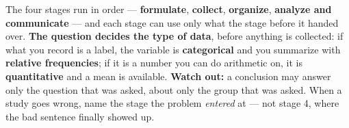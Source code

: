 \documentclass[12pt]{article}
\begin{document}
\vspace{0.14in}

\begin{remindbox}
\small
The four stages run in order --- \textbf{formulate}, \textbf{collect}, \textbf{organize},
\textbf{analyze and communicate} --- and each stage can use only what the stage before it
handed over. \textbf{The question decides the type of data}, before anything is collected: if
what you record is a label, the variable is \textbf{categorical} and you summarize with
\textbf{relative frequencies}; if it is a number you can do arithmetic on, it is
\textbf{quantitative} and a mean is available. \textbf{Watch out:} a conclusion may answer
only the question that was asked, about only the group that was asked. When a study goes
wrong, name the stage the problem \emph{entered} at --- not stage 4, where the bad sentence
finally showed up.
\end{remindbox}
\end{document}

